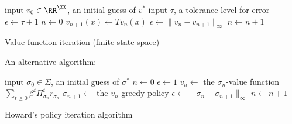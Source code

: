 \begin{frame}
    
    \begin{algorithm}[H]
        input $v_0 \in \RR^\XX$, an initial guess of $v^*$ \;
        input $\tau$, a tolerance level for error \;
        $\epsilon \leftarrow  \tau + 1$ \;
        $n \leftarrow  0$ \;
        \While{$\epsilon > \tau $}
        {
            {
                $v_{n+1}(x) \leftarrow Tv_n(x)$ \;
            }
            $\epsilon \leftarrow \| v_n - v_{n+1} \|_\infty$ \;
            $n \leftarrow n + 1$ \;
        }
        \caption{\label{algo:fsvfi} Value function iteration (finite state space)}
    \end{algorithm}

\end{frame}


\begin{frame}

    An alternative algorithm:


        \vspace{0.5em}
        \vspace{0.5em}
    
    \begin{algorithm}[H]
        input $\sigma_0 \in \Sigma$, an initial guess of $\sigma^*$ \;
        $n \leftarrow  0$ \;
        $\epsilon \leftarrow  1$ \;
        {
            $v_n \leftarrow $ the $\sigma_n$-value function $\sum_{t \geq 0}
                \beta^t \Pi_{\sigma_n}^t r_{\sigma_n}$ \;
            $\sigma_{n+1} \leftarrow $ the $v_n$ greedy policy \;
            $\epsilon \leftarrow \| \sigma_n - \sigma_{n+1} \|_\infty$ \;
            $n \leftarrow n + 1$ \;
        }
        \caption{\label{algo:fshpi} Howard's policy iteration algorithm}
    \end{algorithm}


\end{frame}


